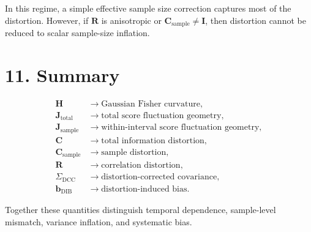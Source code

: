 \documentclass[11pt]{article}
\begin{document}
In this regime, a simple effective sample size correction captures most of the distortion.
However, if $\mathbf R$ is anisotropic or $\mathbf C_{\mathrm{sample}} \neq \mathbf I$, then distortion cannot be reduced to scalar sample-size inflation.

\section*{11. Summary}

\begin{align}
\mathbf H &\rightarrow \text{Gaussian Fisher curvature}, \\
\mathbf J_{\mathrm{total}} &\rightarrow \text{total score fluctuation geometry}, \\
\mathbf J_{\mathrm{sample}} &\rightarrow \text{within-interval score fluctuation geometry}, \\
\mathbf C &\rightarrow \text{total information distortion}, \\
\mathbf C_{\mathrm{sample}} &\rightarrow \text{sample distortion}, \\
\mathbf R &\rightarrow \text{correlation distortion}, \\
\Sigma_{\mathrm{DCC}} &\rightarrow \text{distortion-corrected covariance}, \\
\mathbf b_{\mathrm{DIB}} &\rightarrow \text{distortion-induced bias}.
\end{align}

Together these quantities distinguish temporal dependence, sample-level mismatch, variance inflation, and systematic bias.
\end{document}
